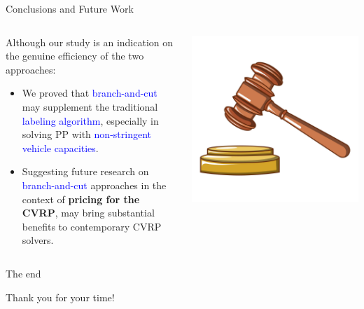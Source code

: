 \begin{frame}{Conclusions and Future Work}
	\begin{columns}
		\begin{column}{0.75\textwidth}
			Although our study is an indication on the genuine efficiency of the two approaches:
			\begin{itemize}
				\item We proved that \textcolor{blue}{branch-and-cut} may supplement the traditional \textcolor{blue}{labeling algorithm},
				      especially in solving PP with \textcolor{blue}{non-stringent vehicle capacities}.
				\item Suggesting future research on \textcolor{blue}{branch-and-cut} approaches in the context of \textbf{pricing for the CVRP},
				      may bring substantial benefits to contemporary CVRP solvers.
			\end{itemize}
		\end{column}
		\begin{column}{0.25\textwidth}
			\centering
			\includegraphics[width=\textwidth]{./Imgs/conclusions.png}
		\end{column}
	\end{columns}
\end{frame}

\begin{frame}{The end}
	\begin{center}
		\begingroup
		\fontsize{18pt}{18pt}\selectfont
		Thank you for your time!
		\endgroup
	\end{center}
\end{frame}


